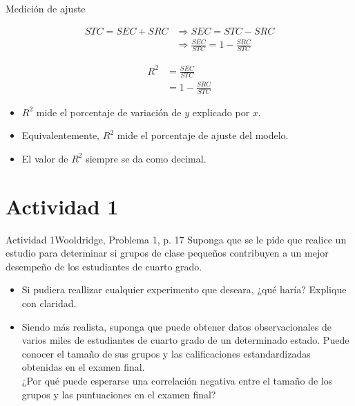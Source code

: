 \documentclass[11pt,handout]{beamer}
\begin{document}
\begin{frame}
{Medición de ajuste}

\begin{align*}
	STC = SEC + SRC &\Rightarrow SEC = STC - SRC \\
			& \Rightarrow \frac{SEC}{STC} = 1 - \frac{SRC}{STC}
\end{align*}

\begin{align*}
	R^2 &  = \frac{SEC}{STC} \\
			& = 1 - \frac{SRC}{STC} 
\end{align*}

\begin{itemize}
	\item $R^2$ mide el porcentaje de variación de $y$ explicado por $x$. 
	
	\item Equivalentemente,  $R^2$ mide el porcentaje de ajuste del modelo.

	\item El valor de $R^2$ siempre se da como decimal.
\end{itemize}

\end{frame}

\section{Actividad 1}

\begin{frame}{Actividad 1}{Wooldridge, Problema 1, p. 17}
	Suponga que se le pide que realice un estudio para determinar si grupos de clase pequeños contribuyen a un mejor desempeño de los estudiantes de cuarto grado. 
	
	\begin{itemize}
		\item Si pudiera reallizar cualquier experimento que deseara, ¿qué haría? Explique con claridad.
		
		\item Siendo más realista, suponga que puede obtener datos observacionales de varios miles de estudiantes de cuarto grado de un determinado estado. Puede conocer el tamaño de sus grupos y las calificaciones estandardizadas obtenidas en el examen final. \\ ¿Por qué puede esperarse una correlación negativa entre el tamaño de los grupos y las puntuaciones en el examen final?
\end{itemize}

\end{frame}
\end{document}
